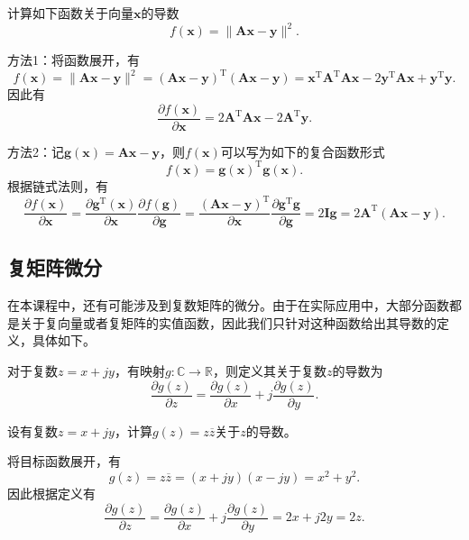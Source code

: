 \begin{example}
    计算如下函数关于向量\( \bm{x} \)的导数
    \[
        f(\bm{x}) = \|\mathbf{A}\bm{x} - \bm{y}\|^2.
    \]
\end{example}
\begin{solution}
    方法1：将函数展开，有
    \[
        f(\bm{x}) = \|\mathbf{A}\bm{x} - \bm{y}\|^2 = (\mathbf{A}\bm{x} - \bm{y})^{\mathrm{T}}(\mathbf{A}\bm{x} - \bm{y}) = \bm{x}^{\mathrm{T}} \mathbf{A}^{\mathrm{T}} \mathbf{A} \bm{x} - 2\bm{y}^{\mathrm{T}} \mathbf{A} \bm{x} + \bm{y}^{\mathrm{T}} \bm{y}.
    \]
    因此有
    \[
        \frac{\partial f(\bm{x})}{\partial \bm{x}} = 2 \mathbf{A}^{\mathrm{T}} \mathbf{A} \bm{x} - 2 \mathbf{A}^{\mathrm{T}} \bm{y}.
    \]

    方法2：记\( \mathbf{g}(\bm{x}) = \mathbf{A}\bm{x} - \bm{y} \)，则\( f(\bm{x}) \)可以写为如下的复合函数形式
    \[
        f(\bm{x}) = \mathbf{g}(\bm{x})^{\mathrm{T}} \mathbf{g}(\bm{x}).
    \]
    根据链式法则，有
    \[
        \frac{\partial f(\bm{x})}{\partial \bm{x}} = \frac{\partial \mathbf{g}^{\mathrm{T}}(\bm{x})}{\partial \bm{x}}\frac{\partial f(\mathbf{g})}{\partial \mathbf{g}} = \frac{(\mathbf{A} \bm{x} - \bm{y})^{\mathrm{T}}}{ \partial \bm{x}} \frac{\partial \mathbf{g}^{\mathrm{T}} \mathbf{g}}{\partial \mathbf{g}} = 2 \mathbf{I}  \mathbf{g} = 2 \mathbf{A}^{\mathrm{T}} (\mathbf{A}\bm{x} - \bm{y}).
    \]
\end{solution}

\subsection{复矩阵微分}

在本课程中，还有可能涉及到复数矩阵的微分。由于在实际应用中，大部分函数都是关于复向量或者复矩阵的实值函数，因此我们只针对这种函数给出其导数的定义，具体如下。

\begin{definition}
    对于复数\( z = x + jy \)，有映射\( g: \mathbb{C} \rightarrow \mathbb{R} \)，则定义其关于复数\( z \)的导数为
    \[
        \frac{\partial g(z)}{\partial z} = \frac{\partial g(z)}{\partial x} + j \frac{\partial g(z)}{\partial y}.
    \]
\end{definition}

\begin{example}
    设有复数\( z = x + jy \)，计算\( g(z) = z \overline{z} \)关于\( z \)的导数。
\end{example}
\begin{solution}
    将目标函数展开，有
    \[
        g(z) = z \overline{z} = (x + jy)(x - jy) = x^2 + y^2.
    \]
    因此根据定义有
    \[
        \frac{\partial g(z)}{\partial z} = \frac{\partial g(z)}{\partial x} + j \frac{\partial g(z)}{\partial y} = 2x + j 2y = 2z.
    \]
\end{solution}

